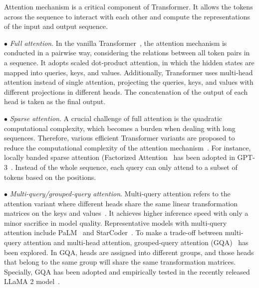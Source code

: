 {{ 
Attention mechanism is a critical component of Transformer. It allows the tokens across the sequence to interact with each other and compute the representations of the input and output sequence. 

{
    $\bullet$ \emph{Full attention}. In the vanilla  Transformer~\cite{Vaswani-NIPS-2017-Attention}, the attention mechanism is conducted in a pairwise way, considering the relations between all token pairs in a sequence. It 
    adopts scaled dot-product attention, in which the hidden states are mapped into queries, keys, and values. 
    Additionally, Transformer uses multi-head attention instead of single attention, projecting the queries, keys, and values with different projections in different heads. The concatenation of the output of each head is taken as the final output.}

{
    $\bullet$ \emph{Sparse attention}. A crucial challenge of full attention is the quadratic computational complexity, which becomes a burden when dealing with long sequences. Therefore, various efficient Transformer variants are proposed to reduce the computational complexity of the attention mechanism~\cite{Peng-ICLR-2021-Random, Zaheer-NIPS-2020-Big}. For instance, locally banded sparse attention (\ie Factorized Attention~\cite{Child-arxiv-2019-Generating} has been adopted  in GPT-3~\cite{Brown-NeurIPS-2020-Language}. Instead of the whole sequence, each query can only attend to a subset of tokens based on the positions. }


    $\bullet$ \emph{Multi-query/grouped-query attention}. Multi-query attention refers to the attention variant
    where different heads share  {the same  linear transformation matrices on the keys and values~\cite{Shazeer-2019-arxiv-Fast}.} 
    It achieves higher inference speed {with only a minor sacrifice in model quality.}
    Representative models with multi-query attention include PaLM~\cite{Chowdhery-arxiv-2022-PaLM} and StarCoder~\cite{Li-2023-arxiv-Starcoder}.  %
    {To make a trade-off between multi-query attention and multi-head attention, grouped-query attention (GQA)~\cite{Ainslie-2023-arxiv-gqa} has been explored. In GQA, heads are assigned into different groups, and those heads that belong to the same group will share the same transformation matrices. Specially, GQA has been adopted and empirically tested in the recently released LLaMA 2 model~\cite{Touvron-2023-llama2-arxiv}.}

}}
